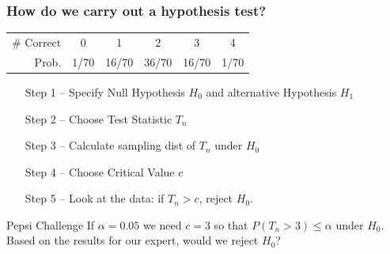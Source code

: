 \begin{frame}
  \frametitle{How do we carry out a hypothesis test?}
            \begin{center}
              \begin{tabular}{rccccc}
                \hline
                \# Correct & 0 & 1 & 2 & 3 & 4\\
                Prob.&1/70 & 16/70 & 36/70 & 16/70 &1/70\\
                \hline
              \end{tabular}
            \end{center}
  \begin{enumerate}
    \item[Step 1] -- Specify Null Hypothesis $H_0$ and alternative Hypothesis $H_1$
    \item[Step 2] -- Choose Test Statistic $T_n$ 
    \item[Step 3] -- Calculate sampling dist of $T_n$ under $H_0$
    \item[Step 4] -- Choose Critical Value $c$
    \item[Step 5] -- Look at the data: if $T_n >c$, reject $H_0$.
  \end{enumerate}

  \begin{alertblock}{Pepsi Challenge}
    If $\alpha = 0.05$ we need $c = 3$ so that $P(T_n >3) \leq \alpha$ under $H_0$.
    Based on the results for our expert, would we reject $H_0$?
  \end{alertblock}
\end{frame}
